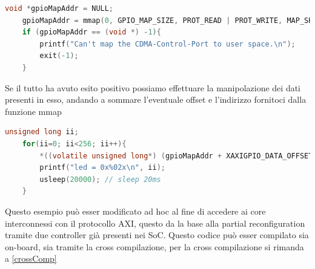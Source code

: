 \begin{lstlisting}[language=C, label=lst:C, caption={Mapping dell'indirizzo di GPIO}]
    void *gpioMapAddr = NULL;
    gpioMapAddr = mmap(0, GPIO_MAP_SIZE, PROT_READ | PROT_WRITE, MAP_SHARED, memfd, GPIO_BASE_ADDRESS);
    if (gpioMapAddr == (void *) -1){
        printf("Can't map the CDMA-Control-Port to user space.\n");
        exit(-1);
    }
\end{lstlisting}
Se il tutto ha avuto esito positivo possiamo effettuare la manipolazione dei dati presenti in esso, andando a sommare l'eventuale offset e l'indirizzo fornitoci dalla funzione mmap
\begin{lstlisting}[language=C, label=lst:C, caption={Esempio con un contatore tramite i led}]
    unsigned long ii;
    for(ii=0; ii<256; ii++){
        *((volatile unsigned long*) (gpioMapAddr + XAXIGPIO_DATA_OFFSET)) = ii;
        printf("led = 0x%02x\n", ii);
        usleep(20000); // sleep 20ms
    }
\end{lstlisting}
Questo esempio può esser modificato ad hoc al fine di accedere ai core interconnessi con il protocollo AXI, questo da la base alla partial reconfiguration tramite due controller già presenti nei SoC. Questo codice può esser compilato sia on-board, sia tramite la cross compilazione, per la cross compilazione si rimanda a \ref{crossComp}\clearpage


